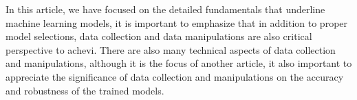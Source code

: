 
\par
In this article, we have focused on the detailed fundamentals that underline machine learning models, it is important to emphasize that in addition to proper model selections, data collection and data manipulations are also critical perspective to achevi. There are also many technical aspects of data collection and manipulations, although it is the focus of another article, it also important to appreciate the significance of data collection and manipulations on the accuracy and robustness of the trained models.
\par 

